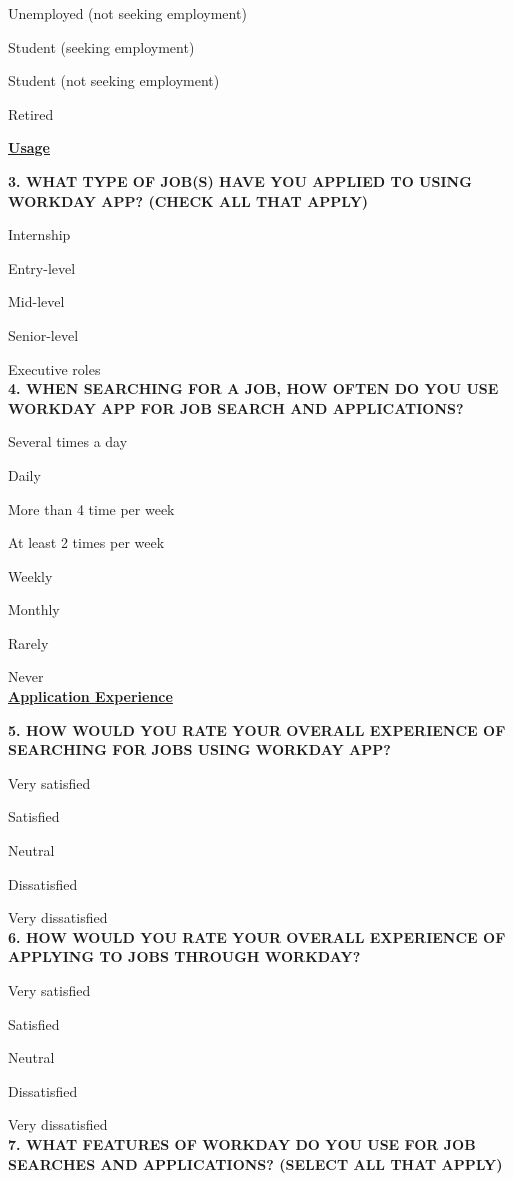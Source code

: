 \documentclass[
	letterpaper, %
]{jdf}
\begin{document}
Unemployed (not seeking employment)

Student (seeking employment)

Student (not seeking employment)

Retired


\underline{\textbf{Usage  }}

\textbf{3. WHAT TYPE OF JOB(S) HAVE YOU APPLIED TO USING WORKDAY APP? (CHECK ALL THAT APPLY)
}

Internship

Entry-level

Mid-level

Senior-level

Executive roles \\



\textbf{4. WHEN SEARCHING FOR A JOB, HOW OFTEN DO YOU USE WORKDAY APP FOR JOB SEARCH AND APPLICATIONS?
}

Several times a day

Daily

More than 4 time per week

At least 2 times per week

Weekly

Monthly

Rarely

Never			
\\

\underline{\textbf{Application Experience  }}

\textbf{5. HOW WOULD YOU RATE YOUR OVERALL EXPERIENCE OF SEARCHING FOR JOBS  USING WORKDAY APP?}

Very satisfied

Satisfied

Neutral

Dissatisfied

Very dissatisfied \\



\textbf{6. HOW WOULD YOU RATE YOUR OVERALL EXPERIENCE OF APPLYING TO JOBS THROUGH WORKDAY?}

Very satisfied

Satisfied

Neutral

Dissatisfied

Very dissatisfied \\

\textbf{7. WHAT FEATURES OF WORKDAY DO YOU USE FOR JOB SEARCHES AND APPLICATIONS? (SELECT ALL THAT APPLY) }
\end{document}
